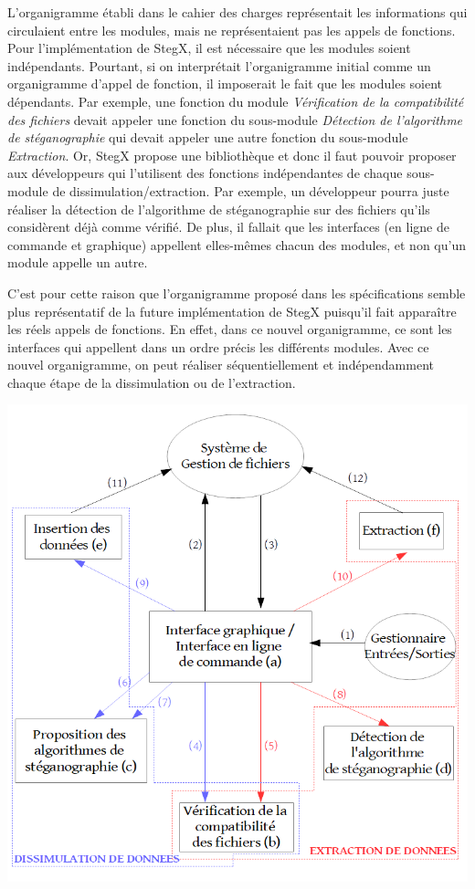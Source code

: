 \documentclass[11pt]{article}
\begin{document}
L'organigramme établi dans le cahier des charges représentait les informations
qui circulaient entre les modules, mais ne représentaient pas les appels de
fonctions. Pour l'implémentation de StegX, il est nécessaire que les modules
soient indépendants. Pourtant, si on interprétait l’organigramme initial comme
un organigramme d’appel de fonction, il imposerait le fait que les modules
soient dépendants. Par exemple, une fonction du module \textit{Vérification de
la compatibilité des fichiers} devait appeler une fonction du sous-module
\textit{Détection de l'algorithme de stéganographie} qui devait appeler une
autre fonction du sous-module \textit{Extraction}. Or, StegX propose une
bibliothèque et donc il faut pouvoir proposer aux développeurs qui l'utilisent
des fonctions indépendantes de chaque sous-module de dissimulation/extraction.
Par exemple, un développeur pourra juste réaliser la détection de l'algorithme
de stéganographie sur des fichiers qu'ils considèrent déjà comme vérifié. De
plus, il fallait que les interfaces (en ligne de commande et graphique)
appellent elles-mêmes chacun des modules, et non qu'un module appelle un autre. 

C'est pour cette raison que l'organigramme proposé dans les spécifications
semble plus représentatif de la future implémentation de StegX puisqu'il fait
apparaître les réels appels de fonctions. En effet, dans ce nouvel organigramme,
ce sont les interfaces qui appellent dans un ordre précis les différents
modules. Avec ce nouvel organigramme, on peut réaliser séquentiellement et
indépendamment chaque étape de la dissimulation ou de l'extraction. 

\includegraphics[scale=0.6]{pictures/organigramme2.png}
\newpage
\end{document}
